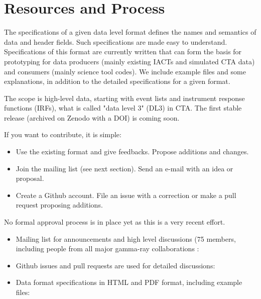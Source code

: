 \section{Resources and Process}


The specifications of a given data level format defines the names and semantics of data and header fields. Such specifications are made easy to understand. Specifications of this format are currently written that can form the basis for prototyping for data producers (mainly existing IACTs and simulated CTA data) and consumers (mainly science tool codes). We include example files and some explanations, in addition to the detailed specifications for a given format. 

The scope is high-level data, starting with event lists and instrument response functions (IRFs), what is called "data level 3" (DL3) in CTA. The first stable release (archived on Zenodo with a DOI) is coming soon.

If you want to contribute, it is simple:

\begin{itemize}
\item{}Use the existing format and give feedbacks. Propose additions and changes.
\item{}Join the mailing list (see next section). Send an e-mail with an idea or proposal.
\item{}Create a Github account. File an issue with a correction or make a pull request proposing additions.
\end{itemize}

No formal approval process is in place yet as this is a very recent effort.


\begin{itemize}
\item{} Mailing list for announcements and high level discussions (75 members, including people from all major gamma-ray collaborations :\\ \ogralist
\item{}Github issues and pull requests are used for detailed discussions:\\ \gadfgithub
\item{}Data format specifications in HTML and PDF format, including example files:\\ \gadfrtd
\end{itemize}

